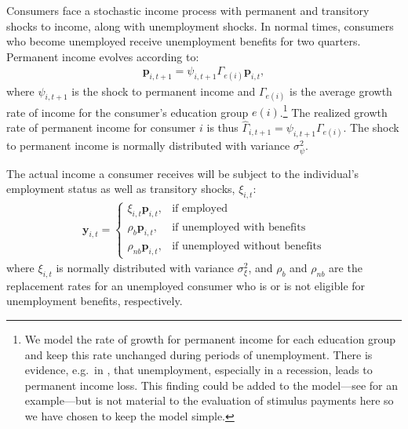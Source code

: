 \documentclass[\econtexRoot/HAFiscal]{subfiles}
\begin{document}
Consumers face a stochastic income process with permanent and transitory shocks to income, along with unemployment shocks. In normal times, consumers who become unemployed receive unemployment benefits for two quarters. Permanent income evolves according to:
\begin{align}
  \mathbf{p}_{i,t+1} = \psi_{i,t+1}\Gamma_{e(i)}\mathbf{p}_{i,t},
\end{align}
where $\psi_{i,t+1}$ is the shock to permanent income and $\Gamma_{e(i)}$ is the average growth rate of income for the consumer's education group $e(i)$.\footnote{We model the rate of growth for permanent income for each education group and keep this rate unchanged during periods of unemployment. There is evidence, e.g.\ in \cite{davis_recessions_2011}, that unemployment, especially in a recession, leads to permanent income loss. This finding could be added to the model---see \citet{carroll2020modeling} for an example---but is not material to the evaluation of stimulus payments here so we have chosen to keep the model simple.  } The realized growth rate of permanent income for consumer $i$ is thus $\hat{\Gamma}_{i,t+1} = \psi_{i,t+1} \Gamma_{e(i)}$. The shock to permanent income is normally distributed with variance $\sigma_{\psi}^2$.

The actual income a consumer receives will be subject to the individual's employment status as well as transitory shocks, $\xi_{i,t}$:
\begin{align}
  \mathbf{y}_{i,t} =   \begin{cases}
    \xi_{i,t}\mathbf{p}_{i,t}, & \text{if employed} \\
    \rho_b \mathbf{p}_{i,t}, & \text{if unemployed with benefits} \\
    \rho_{nb} \mathbf{p}_{i,t}, & \text{if unemployed without benefits} 
  \end{cases}
\end{align}
where $\xi_{i,t}$ is normally distributed with variance $\sigma_{\xi}^2$, and $\rho_b$ and $\rho_{nb}$ are the replacement rates for an unemployed consumer who is or is not eligible for unemployment benefits, respectively. 
\end{document}
